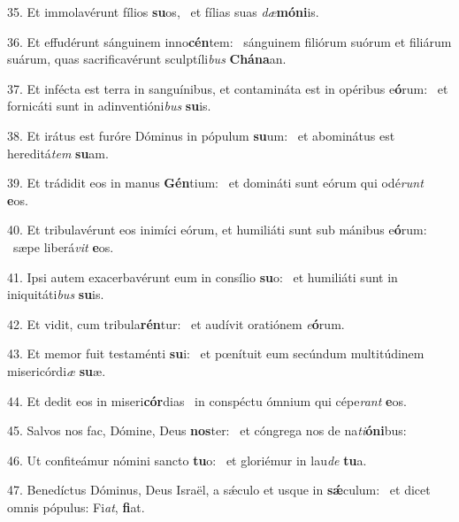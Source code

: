 35. Et immolavérunt fílios \textbf{su}os, \ast\  et fílias suas \textit{dæ}\textbf{mó}\textbf{ni}is.\

36. Et effudérunt sánguinem inno\textbf{cén}tem: \ast\  sánguinem filiórum suórum et filiárum suárum, quas sacrificavérunt sculptíli\textit{bus} \textbf{Chá}\textbf{na}an.\

37. Et infécta est terra in sanguínibus, et contamináta est in opéribus e\textbf{ó}rum: \ast\  et fornicáti sunt in adinventióni\textit{bus} \textbf{su}is.\

38. Et irátus est furóre Dóminus in pópulum \textbf{su}um: \ast\  et abominátus est hereditá\textit{tem} \textbf{su}am.\

39. Et trádidit eos in manus \textbf{Gén}tium: \ast\  et domináti sunt eórum qui odé\textit{runt} \textbf{e}os.\

40. Et tribulavérunt eos inimíci eórum, et humiliáti sunt sub mánibus e\textbf{ó}rum: \ast\  sæpe liberá\textit{vit} \textbf{e}os.\

41. Ipsi autem exacerbavérunt eum in consílio \textbf{su}o: \ast\  et humiliáti sunt in iniquitáti\textit{bus} \textbf{su}is.\

42. Et vidit, cum tribula\textbf{rén}tur: \ast\  et audívit oratiónem \textit{e}\textbf{ó}rum.\

43. Et memor fuit testaménti \textbf{su}i: \ast\  et pœnítuit eum secúndum multitúdinem misericórdi\textit{æ} \textbf{su}æ.\

44. Et dedit eos in miseri\textbf{cór}dias \ast\  in conspéctu ómnium qui cépe\textit{rant} \textbf{e}os.\

45. Salvos nos fac, Dómine, Deus \textbf{nos}ter: \ast\  et cóngrega nos de na\textit{ti}\textbf{ó}\textbf{ni}bus:\

46. Ut confiteámur nómini sancto \textbf{tu}o: \ast\  et gloriémur in lau\textit{de} \textbf{tu}a.\

47. Benedíctus Dóminus, Deus Israël, a sǽculo et usque in \textbf{sǽ}culum: \ast\  et dicet omnis pópulus: Fi\textit{at}, \textbf{fi}at.\

